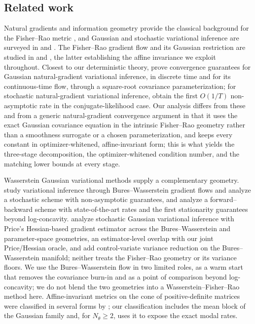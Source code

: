\subsection*{Related work}

Natural gradients and information geometry provide the classical background for
the Fisher--Rao metric \cite{rao1945information, amari1998natural,
amari2016information}, and Gaussian and stochastic variational inference are
surveyed in \citet{blei2017variational} and \citet{JMLR:v14:hoffman13a}. The
Fisher--Rao gradient flow and its Gaussian restriction are studied in
\citet{carrillo2026fisher} and \citet{chen2023sampling}, the latter establishing
the affine invariance we exploit throughout. Closest to our deterministic theory,
\citet{kumar2025squareroot} prove convergence guarantees for Gaussian
natural-gradient variational inference, in discrete time and for its
continuous-time flow, through a square-root covariance parameterization; for
stochastic natural-gradient variational inference, \citet{wu2024understanding}
obtain the first $O(1/T)$ non-asymptotic rate in the conjugate-likelihood case.
Our analysis differs from these and from a generic
natural-gradient convergence argument in that it uses the exact Gaussian
covariance equation in the intrinsic Fisher--Rao geometry rather than a
smoothness surrogate or a chosen parameterization, and keeps every constant
in optimizer-whitened, affine-invariant form; this is what yields the
three-stage decomposition, the optimizer-whitened condition number, and the
matching lower bounds at every stage.

Wasserstein Gaussian variational methods supply a complementary geometry.
\citet{lambert2022variational} study variational inference through
Bures--Wasserstein gradient flows and analyze a stochastic scheme with
non-asymptotic guarantees, and \citet{diao2023forward} analyze a forward--backward
scheme with state-of-the-art rates and the first stationarity guarantees beyond
log-concavity. \citet{kim2026price} analyze stochastic Gaussian variational
inference with Price's Hessian-based gradient estimator across the
Bures--Wasserstein and parameter-space geometries, an estimator-level overlap
with our joint Price/Hessian oracle, and \citet{luu2024variance} add
control-variate variance reduction on the Bures--Wasserstein manifold; neither
treats the Fisher--Rao geometry or its variance floors. We use the Bures--Wasserstein flow in two limited roles, as a
warm start that removes the covariance burn-in and as a point of comparison
beyond log-concavity; we do not blend the two geometries into a
Wasserstein--Fisher--Rao method here. Affine-invariant metrics on the cone of
positive-definite matrices were classified in several forms by
\citet{thanwerdas2019affine, thanwerdas2023n}; our classification includes the
mean block of the Gaussian family and, for $N_\theta \geq 2$, uses it to expose
the exact modal rates.

